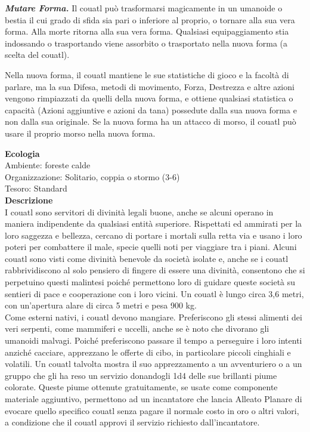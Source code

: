 \begin{multicols}{2}
\emph{\textbf{Mutare Forma.}} Il couatl può trasformarsi magicamente in un umanoide o bestia il cui grado di sfida sia pari o inferiore al proprio, o tornare alla sua vera forma. Alla morte ritorna alla sua vera forma. Qualsiasi equipaggiamento stia indossando o trasportando viene assorbito o trasportato nella nuova forma (a scelta del couatl).

Nella nuova forma, il couatl mantiene le sue statistiche di gioco e la facoltà di parlare, ma la sua Difesa, metodi di movimento, Forza, Destrezza e altre azioni vengono rimpiazzati da quelli della nuova forma, e ottiene qualsiasi statistica o capacità (Azioni aggiuntive e azioni da tana) possedute dalla sua nuova forma e non dalla sua originale. Se la nuova forma ha un attacco di morso, il couatl può usare il proprio morso nella nuova forma.

\textbf{Ecologia}\\
Ambiente: foreste calde\\
Organizzazione: Solitario, coppia o stormo (3-6)\\
Tesoro: Standard\\
\textbf{Descrizione}\\
I couatl sono servitori di divinità legali buone, anche se alcuni operano in maniera indipendente da qualsiasi entità superiore. Rispettati ed ammirati per la loro saggezza e bellezza, cercano di portare i mortali sulla retta via e usano i loro poteri per combattere il male, specie quelli noti per viaggiare tra i piani. Alcuni couatl sono visti come divinità benevole da società isolate e, anche se i couatl rabbrividiscono al solo pensiero di fingere di essere una divinità, consentono che si perpetuino questi malintesi poiché permettono loro di guidare queste società su sentieri di pace e cooperazione con i loro vicini. Un couatl è lungo circa 3,6 metri, con un'apertura alare di circa 5 metri e pesa 900 kg.\\
Come esterni nativi, i couatl devono mangiare. Preferiscono gli stessi alimenti dei veri serpenti, come mammiferi e uccelli, anche se è noto che divorano gli umanoidi malvagi. Poiché preferiscono passare il tempo a perseguire i loro intenti anziché cacciare, apprezzano le offerte di cibo, in particolare piccoli cinghiali e volatili. Un couatl talvolta mostra il suo apprezzamento a un avventuriero o a un gruppo che gli ha reso un servizio donandogli 1d4 delle sue brillanti piume colorate. Queste piume ottenute gratuitamente, se usate come componente materiale aggiuntivo, permettono ad un incantatore che lancia Alleato Planare di evocare quello specifico couatl senza pagare il normale costo in oro o altri valori, a condizione che il couatl approvi il servizio richiesto dall'incantatore.\\



\end{multicols}
